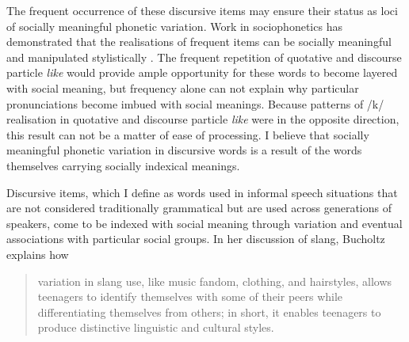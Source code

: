 The frequent occurrence of these discursive items may ensure their status as loci of socially meaningful phonetic variation. Work in sociophonetics has demonstrated that the realisations of frequent items can be socially meaningful and manipulated stylistically \citep{oprah1999}. The frequent repetition of quotative and discourse particle \textit{like} would provide ample opportunity for these words to become layered with social meaning, but frequency alone can not explain why particular pronunciations become imbued with social meanings. Because patterns of /k/ realisation in quotative and discourse particle \textit{like} were in the opposite direction, this result can not be a matter of ease of processing. I believe that socially meaningful phonetic variation in discursive words is a result of the words themselves carrying socially indexical meanings.


Discursive items, which I define as words used in informal speech situations that are not considered traditionally grammatical but are used across generations of speakers, come to be indexed with social meaning through variation and eventual associations with particular social groups. In her discussion of slang, Bucholtz explains how

\begin{quote}
	variation in slang use, like music fandom, clothing, and hairstyles, allows teenagers to identify themselves with some of their peers while differentiating themselves from others; in short, it enables teenagers to produce distinctive linguistic and cultural styles. \citep[251]{bucholtz2006}
\end{quote}

